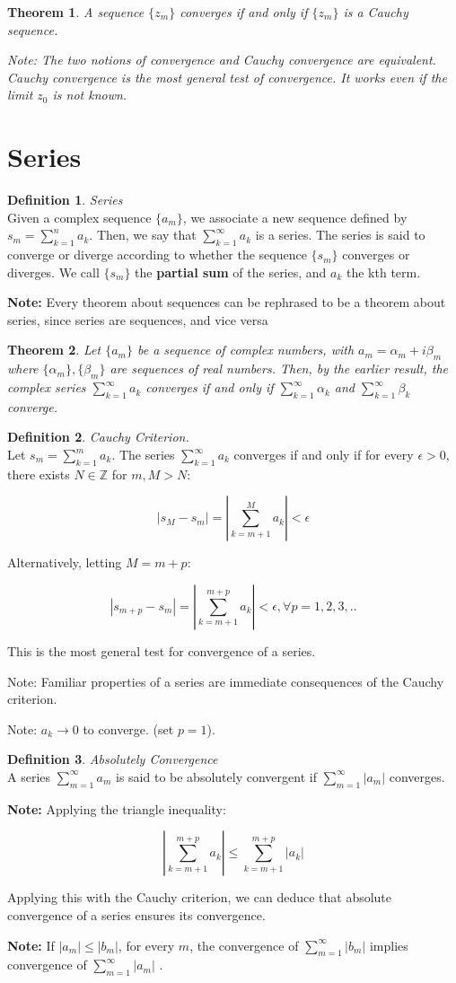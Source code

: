 \documentclass{article}
\newtheorem{theorem}{Theorem}[section]
\theoremstyle{definition}
\newtheorem{definition}{Definition}[section]
\newcommand{\Def}[2]{
\begin{shaded*}
\begin{definition}{\textit{#1}}\\#2\end{definition}
\end{shaded*}
}
\begin{document}
\begin{theorem}
A sequence $\{z_m\}$ converges if and only if $\{z_m\}$ is a Cauchy sequence. 

Note: The two notions of convergence and Cauchy convergence are equivalent. Cauchy convergence is the most general test of convergence. It works even if the limit $z_0$ is not known.
\end{theorem}

\section{Series}
\Def{Series}{Given a complex sequence $\{a_m\}$, we associate a new sequence defined by $s_m = \sum_{k=1}^{n}a_k$. Then, we say that $\sum_{k=1}^{\infty}a_k$ is a series. The series is said to converge or diverge according to whether the sequence $\{s_m\}$ converges or diverges. We call $\{s_m\}$ the \textbf{partial sum} of the series, and $a_k$ the kth term.

\textbf{Note:} Every theorem about sequences can be rephrased to be a theorem about series, since series are sequences, and vice versa
}
\begin{theorem}
Let $\{a_m\}$ be a sequence of complex numbers, with $a_m = \alpha_m+ i \beta_m$ where $\{\alpha_m\}, \{\beta_m\}$ are sequences of real numbers. Then, by the earlier result, the complex series $\sum_{k=1}^{\infty}a_k$ converges if and only if $\sum_{k=1}^{\infty}\alpha_k$ and $\sum_{k=1}^{\infty}\beta_k$ converge.
\end{theorem}


\Def{Cauchy Criterion.}{Let $s_m = \sum_{k=1}^{m}a_k$. The series $\sum_{k=1}^{\infty}a_k$ converges if and only if for every $\epsilon>0$, there exists $N \in \mathbb{Z}$ for $m, M>N$:

$$|s_M - s_m| = \left|\sum_{k=m+1}^{M}a_k\right| < \epsilon$$

Alternatively, letting $M = m+p$:

$$|s_{m+p} - s_m| = \left|\sum_{k=m+1}^{m+p}a_k\right| < \epsilon, \forall p = 1,2,3,..$$

This is the most general test for convergence of a series. 

Note: Familiar properties of a series are immediate consequences of the Cauchy criterion.

Note: $a_k \to 0$ to converge. (set $p=1$).
 }

\Def{Absolutely Convergence}{A series $\sum_{m=1}^{\infty}a_m$ is said to be absolutely convergent if $\sum_{m=1}^{\infty}|a_m|$ converges. 

\textbf{Note:} Applying the triangle inequality:

$$\left|\sum_{k=m+1}^{m+p}a_k\right| \leq \sum_{k=m+1}^{m+p}\left|a_k\right|$$

Applying this with the Cauchy criterion, we can deduce that absolute convergence of a series ensures its convergence. 

\textbf{Note:} If $|a_m| \leq |b_m|$, for every $m$, the convergence of $\sum_{m=1}^{\infty} |b_m|$ implies convergence of $\sum_{m=1}^{\infty} |a_m|$ .
}
\end{document}
